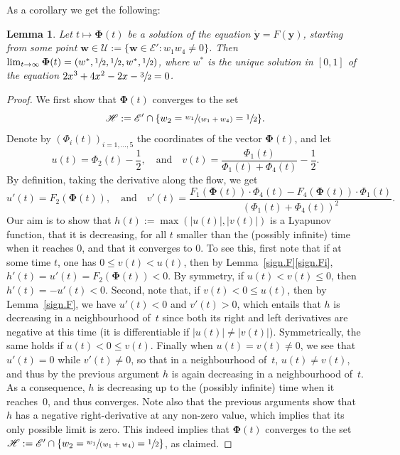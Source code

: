 \documentclass[JEP,XML,SOM,Unicode,NoFloatCountersInSection,published]{cedram}
\let\mathcal\mathscr
\let \nicefrac\sfrac
\newcommand{\spfrac}[2]{\sfrac{#1}{(#2)}}
\numberwithin{equation}{section}
\newtheorem{lemma}[theorem]{Lemma}
\theoremstyle{definition}
\let\bs\boldsymbol
\begin{document}
As a corollary we get the following:
\begin{lemma}\label{lem:conv.lozenge}
Let $t\mapsto \bs \Phi(t)$ be a solution of the equation ${\bs{\dot y}} =F({\bs y})$, starting from some point $\bs w\in \mathcal U:=\{\bs w \in \mathcal E' : w_1w_4\neq 0\}$.
Then $\lim_{t\to \infty} \bs \Phi(t) = (w^*, \nicefrac12, \nicefrac12, w^*, \nicefrac12)$, where $w^*$ is the unique solution in $[0,1]$ of the equation $2x^3+4x^2-2x-\sfrac32=0$.
\end{lemma}
\begin{proof}
We first show that $\bs \Phi(t)$ converges to the set
\[
\mathcal H:= \mathcal E'\cap \{w_2={\spfrac{w_1}{w_1+w_4}}=\nicefrac12\}.
\]
Denote by $(\Phi_i(t))_{i=1,\dots,5}$ the coordinates of the vector $\bs \Phi(t)$, and let
\[
u(t) = \Phi_2(t) - \frac12, \quad \text{and}\quad v(t) = \frac{\Phi_1(t)}{\Phi_1(t)+ \Phi_4(t)} - \frac12.
\]
By definition, taking the derivative along the flow, we get
\[
u'(t) = F_2 (\bs \Phi(t)), \quad \text{and}\quad v'(t) = \frac{F_1(\bs \Phi(t))\cdot \Phi_4(t) - F_4(\bs \Phi(t))\cdot\Phi_1(t)}{(\Phi_1(t) + \Phi_4(t))^2 }.
\]
Our aim is to show that $h(t):=\max(|u(t)|,|v(t)|)$ is a Lyapunov function, \ie that it is decreasing, for all $t$ smaller than the (possibly infinite) time when it reaches $0$, and that it converges to $0$. To see this, first note that if at some time $t$, one has $0\le v(t)<u(t)$,
then by Lemma~\ref{sign.F}\eqref{sign.Fi}, $h'(t) = u'(t) = F_2(\bs \Phi(t)) <0$. By symmetry, if $u(t)<v(t) \le 0$, then $h'(t) = -u'(t) <0$.
Second, note that, if $v(t) < 0 \le u(t)$, then by Lemma~\ref{sign.F}, we have $u'(t) <0$ and $v'(t)>0$, which entails that $h$ is decreasing in a neighbourhood of~$t$ since both its right and left derivatives are negative at this time (it is differentiable if $|u(t)|\neq |v(t)|$).
Symmetrically, the same holds if $u(t)<0\le v(t)$.
Finally when $u(t) = v(t)\neq 0$, we see that $u'(t) = 0$ while
$v'(t)\neq 0$, so that in a neighbourhood of~$t$,
$u(t)\neq v(t)$, and thus by the previous argument $h$ is again decreasing in a neighbourhood of~$t$.
As a consequence, $h$ is decreasing up to the (possibly infinite) time when it reaches~$0$, and thus converges. Note also that the previous arguments show that~$h$ has a negative right-derivative at any non-zero value, which implies that its only possible limit is zero.
This indeed implies that $\bs \Phi(t)$ converges to the set $\mathcal H:= \mathcal E'\cap \{w_2={\spfrac{w_1}{w_1+w_4}}=\nicefrac12\}$, as claimed.


\end{proof}
\end{document}

